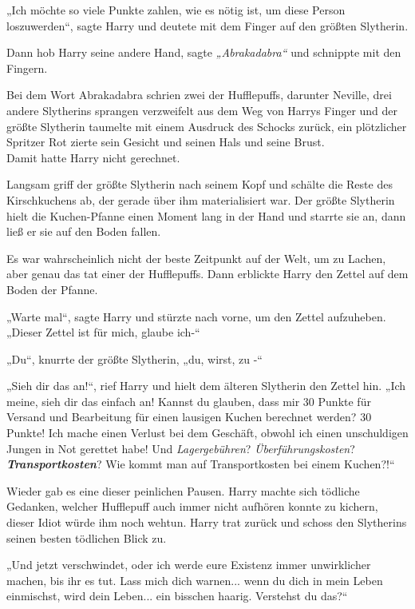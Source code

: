 {„Ich möchte so viele Punkte zahlen, wie es nötig ist, um diese Person loszuwerden“, sagte Harry und deutete mit dem Finger auf den größten Slytherin.

Dann hob Harry seine andere Hand, sagte \emph{„Abrakadabra“} und schnippte mit den Fingern.

Bei dem Wort Abrakadabra schrien zwei der Hufflepuffs, darunter Neville, drei andere Slytherins sprangen verzweifelt aus dem Weg von Harrys Finger und der größte Slytherin taumelte mit einem Ausdruck des Schocks zurück, ein plötzlicher Spritzer Rot zierte sein Gesicht und seinen Hals und seine Brust.\\ Damit hatte Harry nicht gerechnet.

Langsam griff der größte Slytherin nach seinem Kopf und schälte die Reste des Kirschkuchens ab, der gerade über ihm materialisiert war. Der größte Slytherin hielt die Kuchen-Pfanne einen Moment lang in der Hand und starrte sie an, dann ließ er sie auf den Boden fallen.

Es war wahrscheinlich nicht der beste Zeitpunkt auf der Welt, um zu Lachen, aber genau das tat einer der Hufflepuffs. Dann erblickte Harry den Zettel auf dem Boden der Pfanne.

„Warte mal“, sagte Harry und stürzte nach vorne, um den Zettel aufzuheben. „Dieser Zettel ist für mich, glaube ich-“

„Du“, knurrte der größte Slytherin, „du, wirst, zu -“

„Sieh dir das an!“, rief Harry und hielt dem älteren Slytherin den Zettel hin. „Ich meine, sieh dir das einfach an! Kannst du glauben, dass mir 30 Punkte für Versand und Bearbeitung für einen lausigen Kuchen berechnet werden? 30 Punkte! Ich mache einen Verlust bei dem Geschäft, obwohl ich einen unschuldigen Jungen in Not gerettet habe! Und \emph{Lagergebühren}? \emph{Überführungskosten}? \textbf{\emph{Transportkosten}}? Wie kommt man auf Transportkosten bei einem Kuchen?!“

Wieder gab es eine dieser peinlichen Pausen. Harry machte sich tödliche Gedanken, welcher Hufflepuff auch immer nicht aufhören konnte zu kichern, dieser Idiot würde ihm noch wehtun. Harry trat zurück und schoss den Slytherins seinen besten tödlichen Blick zu.

„Und jetzt verschwindet, oder ich werde eure Existenz immer unwirklicher machen, bis ihr es tut. Lass mich dich warnen... wenn du dich in mein Leben einmischst, wird dein Leben... ein bisschen haarig. Verstehst du das?“

}
